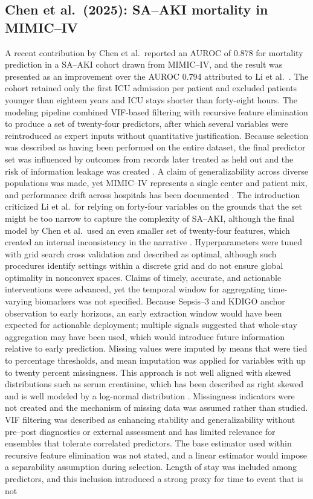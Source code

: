\subsection{Chen et al.\ (2025): SA--AKI mortality in MIMIC--IV}
A recent contribution by Chen et al.\ reported an AUROC of 0.878 for mortality prediction in a SA--AKI cohort drawn from MIMIC--IV, and the result was presented as an improvement over the AUROC 0.794 attributed to Li et al.\ \citep{Chen_2025,Li_2023_SciRep}. The cohort retained only the first ICU admission per patient and excluded patients younger than eighteen years and ICU stays shorter than forty-eight hours. The modeling pipeline combined VIF-based filtering with recursive feature elimination to produce a set of twenty-four predictors, after which several variables were reintroduced as expert inputs without quantitative justification. Because selection was described as having been performed on the entire dataset, the final predictor set was influenced by outcomes from records later treated as held out and the risk of information leakage was created \citep{Kang_Yoon_2023}. A claim of generalizability across diverse populations was made, yet MIMIC--IV represents a single center and patient mix, and performance drift across hospitals has been documented \citep{Johnson_2023_MIMIC,Rockenschaub_2024}. The introduction criticized Li et al.\ for relying on forty-four variables on the grounds that the set might be too narrow to capture the complexity of SA--AKI, although the final model by Chen et al.\ used an even smaller set of twenty-four features, which created an internal inconsistency in the narrative \citep{Chen_2025,Li_2023_SciRep}. Hyperparameters were tuned with grid search cross validation and described as optimal, although such procedures identify settings within a discrete grid and do not ensure global optimality in nonconvex spaces. Claims of timely, accurate, and actionable interventions were advanced, yet the temporal window for aggregating time-varying biomarkers was not specified. Because Sepsis--3 and KDIGO anchor observation to early horizons, an early extraction window would have been expected for actionable deployment; multiple signals suggested that whole-stay aggregation may have been used, which would introduce future information relative to early prediction. Missing values were imputed by means that were tied to percentage thresholds, and mean imputation was applied for variables with up to twenty percent missingness. This approach is not well aligned with skewed distributions such as serum creatinine, which has been described as right skewed and is well modeled by a log-normal distribution \citep{Haeckel_2010}. Missingness indicators were not created and the mechanism of missing data was assumed rather than studied. VIF filtering was described as enhancing stability and generalizability without pre–post diagnostics or external assessment and has limited relevance for ensembles that tolerate correlated predictors. The base estimator used within recursive feature elimination was not stated, and a linear estimator would impose a separability assumption during selection. Length of stay was included among predictors, and this inclusion introduced a strong proxy for time to event that is not 